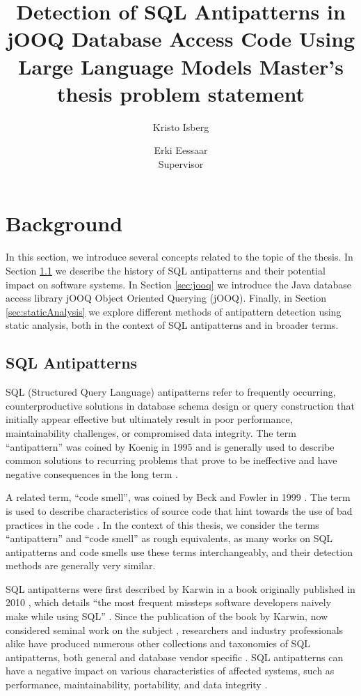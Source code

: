 \documentclass{article}
\title{Detection of SQL Antipatterns in jOOQ Database Access Code Using Large Language Models
    \newline\newline
    \large{Master's thesis problem statement}
}
\author{
  Kristo Isberg
  \and
  Erki Eessaar\\
  \small{Supervisor}
}
\begin{document}
\maketitle

\section{Background}

In this section, we introduce several concepts related to the topic of the thesis. In Section \ref{sec:sqlAntipatterns} we describe the history of SQL antipatterns and their potential impact on software systems. In Section \ref{sec:jooq} we introduce the Java database access library jOOQ Object Oriented Querying (jOOQ). Finally, in Section \ref{sec:staticAnalysis} we explore different methods of antipattern detection using static analysis, both in the context of SQL antipatterns and in broader terms.

\subsection{SQL Antipatterns}\label{sec:sqlAntipatterns}

SQL (Structured Query Language) antipatterns refer to frequently occurring, counterproductive solutions in database schema design or query construction that initially appear effective but ultimately result in poor performance, maintainability challenges, or compromised data integrity. The term “antipattern” was coined by Koenig in 1995 \cite[p. 46]{koenig1995patterns} and is generally used to describe common solutions to recurring problems that prove to be ineffective and have negative consequences in the long term \cites[p. 1]{karwin2023sql}[p. 4]{ambler1998process}[p. 6]{brown1998antipatterns}. 

A related term, “code smell”, was coined by Beck and Fowler in 1999 \cite[Ch. 3]{fowler2019refactoring}. The term is used to describe characteristics of source code that hint towards the use of bad practices in the code \cite[pp. 71–72]{fowler2019refactoring}. In the context of this thesis, we consider the terms “antipattern” and “code smell” as rough equivalents, as many works on SQL antipatterns and code smells use these terms interchangeably, and their detection methods are generally very similar.

SQL antipatterns were first described by Karwin in a book originally published in 2010 \cite{karwin2023sql}, which details “the most frequent missteps software developers naively make while using SQL” \cite[p. 1]{karwin2023sql}. Since the publication of the book by Karwin, now considered seminal work on the subject \cite[p. 336]{muse2020prevalence}, researchers and industry professionals alike have produced numerous other collections and taxonomies of SQL antipatterns, both general \cites{alshemaimri2021survey}{10.1007/978-3-031-09070-7_26}{10.1007/978-3-031-35311-6_51}{factor2014sql} and database vendor specific \cite{angelakos2025PostgreSQL}. SQL antipatterns can have a negative impact on various characteristics of affected systems, such as performance, maintainability, portability, and data integrity \cite[p. 4]{alshemaimri2021survey}.
\end{document}
